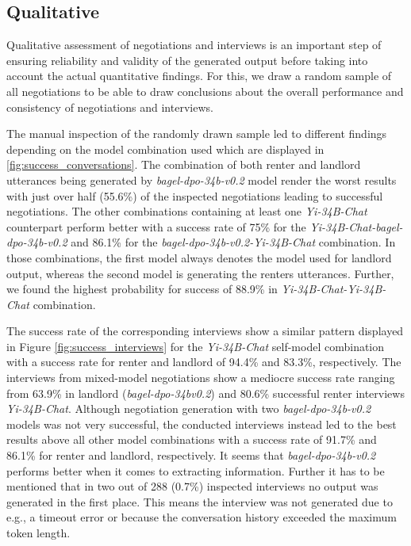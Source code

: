 \documentclass[runningheads]{llncs}
\begin{document}
\subsection{Qualitative} \label{qualitative}

Qualitative assessment of negotiations and interviews is an important step of ensuring reliability and validity of the generated output before taking into account the actual quantitative findings. For this, we draw a random sample of all negotiations to be able to draw conclusions about the overall performance and consistency of negotiations and interviews. 

The manual inspection of the randomly drawn sample led to different findings depending on the model combination used which are displayed in \ref{fig:success_conversations}. The combination of both renter and landlord utterances being generated by \textit{bagel-dpo-34b-v0.2} model render the worst results with just over half (55.6\%) of the inspected negotiations leading to successful negotiations. The other combinations containing at least one \textit{Yi-34B-Chat} counterpart perform better with a success rate of 75\% for the \textit{Yi-34B-Chat-bagel-dpo-34b-v0.2} and 86.1\% for the \textit{bagel-dpo-34b-v0.2-Yi-34B-Chat} combination. In those combinations, the first model always denotes the model used for landlord output, whereas the second model is generating the renters utterances. Further, we found the highest probability for success of 88.9\% in \textit{Yi-34B-Chat-Yi-34B-Chat} combination. 


The success rate of the corresponding interviews show a similar pattern displayed in Figure \ref{fig:success_interviews} for the \textit{Yi-34B-Chat} self-model combination with a success rate for renter and landlord of 94.4\% and 83.3\%, respectively. The interviews from mixed-model negotiations show a mediocre success rate ranging from 63.9\% in landlord (\textit{bagel-dpo-34bv0.2}) and 80.6\% successful renter interviews \textit{Yi-34B-Chat}. Although negotiation generation with two \textit{bagel-dpo-34b-v0.2} models was not very successful, the conducted interviews instead led to the best results above all other model combinations with a success rate of 91.7\% and 86.1\% for renter and landlord, respectively. It seems that \textit{bagel-dpo-34b-v0.2} performs better when it comes to extracting information. Further it has to be mentioned that in two out of 288 (0.7\%) inspected interviews no output was generated in the first place. This means the interview was not generated due to e.g., a timeout error or because the conversation history exceeded the maximum token length.
\end{document}
